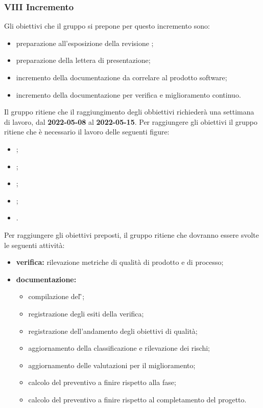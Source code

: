 
\pagebreak

\subsubsection{VIII Incremento}
Gli obiettivi che il gruppo si prepone per questo incremento sono:
\begin{itemize}
	\item preparazione all’esposizione della revisione \PB{};
  	\item preparazione della lettera di presentazione;
 	\item incremento della documentazione da correlare al prodotto software;
	\item incremento della documentazione per verifica e miglioramento continuo.
\end{itemize}
Il gruppo ritiene che il raggiungimento degli obbiettivi richiederà una settimana di lavoro, dal \textbf{2022-05-08} al \textbf{2022-05-15}.
Per raggiungere gli obiettivi il gruppo ritiene che è necessario il lavoro delle seguenti figure:
\begin{itemize}
	\item \RE{};
 	\item \AM{};
   	\item \PT{};
    \item \PR{};
   	\item \VE{}.
\end{itemize}
Per raggiungere gli obiettivi preposti, il gruppo ritiene che dovranno essere svolte le seguenti attività:
\begin{itemize}
 	\item \textbf{verifica:} rilevazione metriche di qualità di prodotto e di processo;
	\item \textbf{documentazione:} 
	 \begin{itemize}
		\item compilazione del \G{};
  		\item registrazione degli esiti della verifica;
     	\item registrazione dell’andamento degli obiettivi di qualità;
      	\item aggiornamento della classificazione e rilevazione dei rischi;
		\item aggiornamento delle valutazioni per il miglioramento; 
		\item calcolo del preventivo a finire rispetto alla fase;
		\item calcolo del preventivo a finire rispetto al completamento del progetto.
	 \end{itemize}
\end{itemize}

